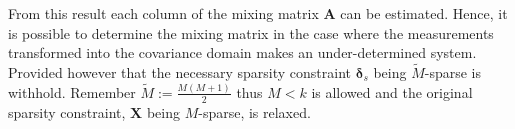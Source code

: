 From this result each column of the mixing matrix $\mathbf{A}$ can be estimated. 
Hence, it is possible to determine the mixing matrix in the case where the measurements transformed into the covariance domain makes an under-determined system.
Provided however that the necessary sparsity constraint $\boldsymbol{\delta}_s$ being $\widetilde{M}$-sparse is withhold. 
Remember $\widetilde{M} := \frac{M(M+1)}{2}$ thus $M < k$ is allowed and the original sparsity constraint, $\mathbf{X}$ being $M$-sparse, is relaxed. 





